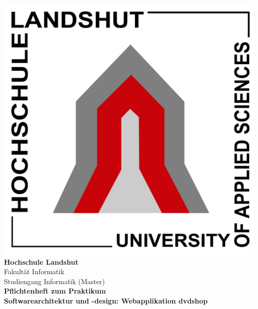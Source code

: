 \documentclass[12pt,oneside,a4paper,bibtotoc,liststotoc,pointlessnumbers]{scrartcl}
\begin{document}
\begin{center}
\includegraphics[scale=0.16]{hs.pdf}\\
\vspace*{10pt}
\textsf{\textbf{\large{Hochschule Landshut}}}\\
\textsf{\normalsize{Fakultät Informatik \\ Studiengang Informatik (Master)}}\\
\vspace*{70pt}
\textsf{\textbf{\Huge{Pflichtenheft zum Praktikum }}} \\
\vspace*{20pt}
\textsf{\textbf{\large{Softwarearchitektur und -design: Webapplikation dvdshop}}}\\
\end{center}
\vspace*{180pt}
\end{document}
